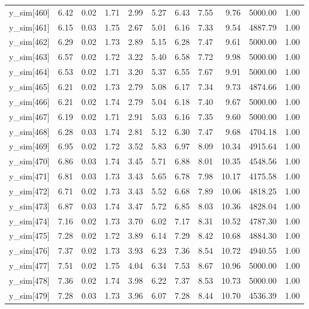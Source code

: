 \begin{table}[ht]
\begin{tabular}{rrrrrrrrrrr}
  y\_sim[460] & 6.42 & 0.02 & 1.71 & 2.99 & 5.27 & 6.43 & 7.55 & 9.76 & 5000.00 & 1.00 \\ 
  y\_sim[461] & 6.15 & 0.03 & 1.75 & 2.67 & 5.01 & 6.16 & 7.33 & 9.54 & 4887.79 & 1.00 \\ 
  y\_sim[462] & 6.29 & 0.02 & 1.73 & 2.89 & 5.15 & 6.28 & 7.47 & 9.61 & 5000.00 & 1.00 \\ 
  y\_sim[463] & 6.57 & 0.02 & 1.72 & 3.22 & 5.40 & 6.58 & 7.72 & 9.98 & 5000.00 & 1.00 \\ 
  y\_sim[464] & 6.53 & 0.02 & 1.71 & 3.20 & 5.37 & 6.55 & 7.67 & 9.91 & 5000.00 & 1.00 \\ 
  y\_sim[465] & 6.21 & 0.02 & 1.73 & 2.79 & 5.08 & 6.17 & 7.34 & 9.73 & 4874.66 & 1.00 \\ 
  y\_sim[466] & 6.21 & 0.02 & 1.74 & 2.79 & 5.04 & 6.18 & 7.40 & 9.67 & 5000.00 & 1.00 \\ 
  y\_sim[467] & 6.19 & 0.02 & 1.71 & 2.91 & 5.03 & 6.16 & 7.35 & 9.60 & 5000.00 & 1.00 \\ 
  y\_sim[468] & 6.28 & 0.03 & 1.74 & 2.81 & 5.12 & 6.30 & 7.47 & 9.68 & 4704.18 & 1.00 \\ 
  y\_sim[469] & 6.95 & 0.02 & 1.72 & 3.52 & 5.83 & 6.97 & 8.09 & 10.34 & 4915.64 & 1.00 \\ 
  y\_sim[470] & 6.86 & 0.03 & 1.74 & 3.45 & 5.71 & 6.88 & 8.01 & 10.35 & 4548.56 & 1.00 \\ 
  y\_sim[471] & 6.81 & 0.03 & 1.73 & 3.43 & 5.65 & 6.78 & 7.98 & 10.17 & 4175.58 & 1.00 \\ 
  y\_sim[472] & 6.71 & 0.02 & 1.73 & 3.43 & 5.52 & 6.68 & 7.89 & 10.06 & 4818.25 & 1.00 \\ 
  y\_sim[473] & 6.87 & 0.03 & 1.74 & 3.47 & 5.72 & 6.85 & 8.03 & 10.36 & 4828.04 & 1.00 \\ 
  y\_sim[474] & 7.16 & 0.02 & 1.73 & 3.70 & 6.02 & 7.17 & 8.31 & 10.52 & 4787.30 & 1.00 \\ 
  y\_sim[475] & 7.28 & 0.02 & 1.72 & 3.89 & 6.14 & 7.29 & 8.42 & 10.68 & 4884.30 & 1.00 \\ 
  y\_sim[476] & 7.37 & 0.02 & 1.73 & 3.93 & 6.23 & 7.36 & 8.54 & 10.72 & 4940.55 & 1.00 \\ 
  y\_sim[477] & 7.51 & 0.02 & 1.75 & 4.04 & 6.34 & 7.53 & 8.67 & 10.96 & 5000.00 & 1.00 \\ 
  y\_sim[478] & 7.36 & 0.02 & 1.74 & 3.98 & 6.22 & 7.37 & 8.53 & 10.73 & 5000.00 & 1.00 \\ 
  y\_sim[479] & 7.28 & 0.03 & 1.73 & 3.96 & 6.07 & 7.28 & 8.44 & 10.70 & 4536.39 & 1.00 \\ 

\end{tabular}
\end{table}
